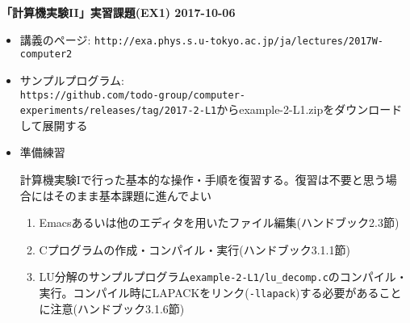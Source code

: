 \documentclass[11pt]{jarticle}
\begin{document}
\noindent
{\bf\large 「計算機実験II」実習課題(EX1) 2017-10-06}
\\[-0.5em]

\noindent
\begin{itemize}
\item 講義のページ: \verb+http://exa.phys.s.u-tokyo.ac.jp/ja/lectures/2017W-computer2+

\item サンプルプログラム: \\ {\small \verb+https://github.com/todo-group/computer-experiments/releases/tag/2017-2-L1+}からexample-2-L1.zipをダウンロードして展開する

\item 準備練習
  
  計算機実験Iで行った基本的な操作・手順を復習する。復習は不要と思う場合にはそのまま基本課題に進んでよい
  \begin{enumerate}
  \item Emacsあるいは他のエディタを用いたファイル編集(ハンドブック2.3節)
  \item Cプログラムの作成・コンパイル・実行(ハンドブック3.1.1節)
  \item LU分解のサンプルプログラム{\tt example-2-L1/lu\_decomp.c}のコンパイル・実行。コンパイル時にLAPACKをリンク({\tt -llapack})する必要があることに注意(ハンドブック3.1.6節)
  \end{enumerate}


\end{itemize}
\end{document}
